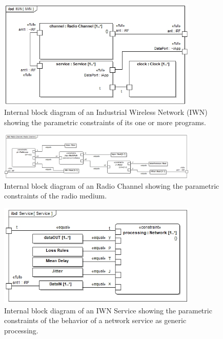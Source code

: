 \begin{figure}[!th]
	\centering
	\includegraphics[width=0.85\textwidth]{chapter-conclusions/images/IWN}
	\caption{Internal block diagram of an Industrial Wireless Network (IWN) showing the parametric constraints of its one or more programs.}
	\label{fig:concl:iwn-ibd}
\end{figure}

\begin{figure}[!th]
	\centering
	\includegraphics[width=0.85\textwidth]{chapter-conclusions/images/RadioChannel}
	\caption{Internal block diagram of an Radio Channel showing the parametric constraints of the radio medium.}
	\label{fig:concl:RadioChannel-ibd}
\end{figure}

\begin{figure}[!th]
	\centering
	\includegraphics[width=0.85\textwidth]{chapter-conclusions/images/Service}
	\caption{Internal block diagram of an IWN Service showing the parametric constraints of the behavior of a network service as generic processing.}
	\label{fig:concl:Service-ibd}
\end{figure}

